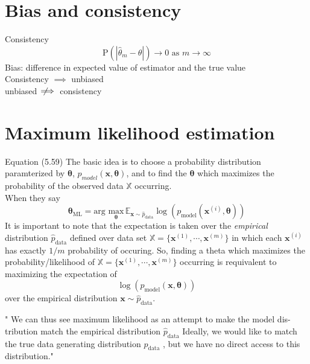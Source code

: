 \documentclass{article}
\newcommand{\beq}{\begin{equation}}
\newcommand{\eeq}{\end{equation}}
\newcommand{\notimplies}{\;\not\!\!\!\implies}
\begin{document}
\section{Bias and consistency}
Consistency
\beq
\text{P}(|\hat{\theta}_m - \theta|) \rightarrow 0 \text{ as } m \rightarrow \infty
\eeq
Bias: difference in expected value of estimator and the true value\\
Consistency $\implies$ unbiased\\
unbiased $\notimplies$ consistency
\section{\label{sect:mle}Maximum likelihood estimation}
Equation (5.59) The basic idea is to choose a probability distribution paramterized by $\pmb{\theta}$, $p_{model}(\pmb{x},\pmb{\theta})$, and to find the $\pmb{\theta}$ which maximizes the probability of the observed data $\mathbb{X}$ occurring.\\
When they say
\beq
\mathbf{\theta}_{\text{ML}} = \text{arg } \underset{\pmb{\theta}}{\text{max}} \, \mathbb{E}_{\mathbf{x}\sim\hat{p}_{\text{data}}}\log(p_{\text{model}}(\pmb{x}^{(i)},\pmb{\theta}))
\eeq
It is important to note that the expectation is taken over the \textit{empirical} distribution $\hat{p}_{\text{data}}$ defined over data set $\mathbb{X}=\{\pmb{x}^{(1)},\cdots,\pmb{x}^{(m)}\}$ in which each $\pmb{x}^{(i)}$ has exactly $1/m$ probability of occuring. So, finding a theta which maximizes the probability/likelihood of $\mathbb{X}=\{\pmb{x}^{(1)},\cdots,\pmb{x}^{(m)}\}$ occurring is requivalent to maximizing the expectation of
\beq
\log(p_{\text{model}}(\pmb{x},\pmb{\theta}))
\eeq
over the empirical distribution $\mathbf{x}\sim\hat{p}_{\text{data}}$.

" We can thus see maximum likelihood as an attempt to make the model dis-
tribution match the empirical distribution $\hat{p}_{\text{data}}$ Ideally, we would like to match
the true data generating distribution $p_{\text{data}}$ , but we have no direct access to this
distribution."
\end{document}

